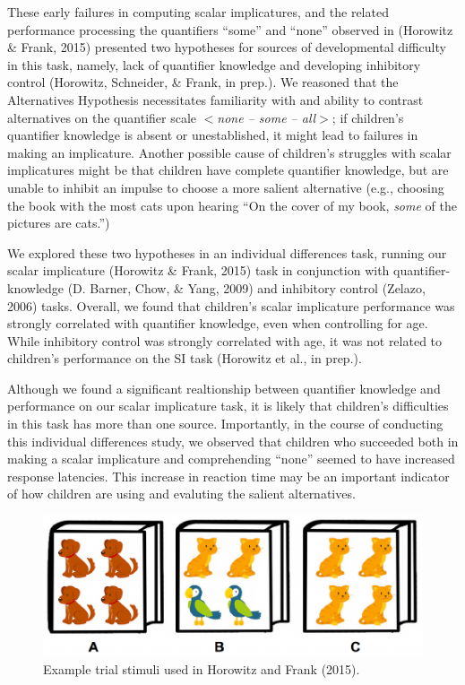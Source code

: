 \documentclass[10pt, letterpaper]{article}
\newenvironment{CodeChunk}{}{}
\begin{document}
These early failures in computing scalar implicatures, and the related
performance processing the quantifiers ``some'' and ``none'' observed in
(Horowitz \& Frank, 2015) presented two hypotheses for sources of
developmental difficulty in this task, namely, lack of quantifier
knowledge and developing inhibitory control (Horowitz, Schneider, \&
Frank, in prep.). We reasoned that the Alternatives Hypothesis
necessitates familiarity with and ability to contrast alternatives on
the quantifier scale \(<\)\emph{none -- some -- all}\(>\); if children's
quantifier knowledge is absent or unestablished, it might lead to
failures in making an implicature. Another possible cause of children's
struggles with scalar implicatures might be that children have complete
quantifier knowledge, but are unable to inhibit an impulse to choose a
more salient alternative (e.g., choosing the book with the most cats
upon hearing ``On the cover of my book, \emph{some} of the pictures are
cats.'')

We explored these two hypotheses in an individual differences task,
running our scalar implicature (Horowitz \& Frank, 2015) task in
conjunction with quantifier-knowledge (D. Barner, Chow, \& Yang, 2009)
and inhibitory control (Zelazo, 2006) tasks. Overall, we found that
children's scalar implicature performance was strongly correlated with
quantifier knowledge, even when controlling for age. While inhibitory
control was strongly correlated with age, it was not related to
children's performance on the SI task (Horowitz et al., in prep.).

Although we found a significant realtionship between quantifier
knowledge and performance on our scalar implicature task, it is likely
that children's difficulties in this task has more than one source.
Importantly, in the course of conducting this individual differences
study, we observed that children who succeeded both in making a scalar
implicature and comprehending ``none'' seemed to have increased response
latencies. This increase in reaction time may be an important indicator
of how children are using and evaluting the salient alternatives.

\begin{CodeChunk}
\begin{figure}[b]

{\centering \includegraphics{figs/image-1} 

}

\caption[Example trial stimuli used in Horowitz and Frank (2015)]{Example trial stimuli used in Horowitz and Frank (2015).}\label{fig:image}
\end{figure}
\end{CodeChunk}
\end{document}
